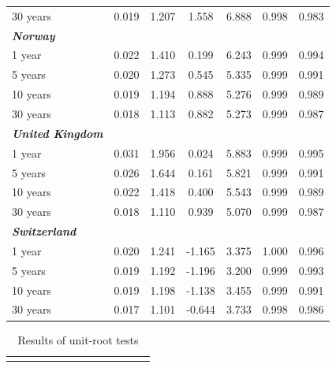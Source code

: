 \documentclass[12pt,bibliography=totoc]{article}
\begin{document}
\begin{appendices}
\begin{table}[H]
\begin{tabular}{l c c c c c c}
30 years	&	0.019	&	1.207	&	1.558	&	6.888	&	0.998	&	0.983	\\
\textbf{\textit{Norway}}	&		&		&		&		&		&		\\
1 year	&	0.022	&	1.410	&	0.199	&	6.243	&	0.999	&	0.994	\\
5 years	&	0.020	&	1.273	&	0.545	&	5.335	&	0.999	&	0.991	\\
10 years	&	0.019	&	1.194	&	0.888	&	5.276	&	0.999	&	0.989	\\
												
30 years	&	0.018	&	1.113	&	0.882	&	5.273	&	0.999	&	0.987	\\
\textbf{\textit{United Kingdom}}	&		&		&		&		&		&		\\
1 year	&	0.031	&	1.956	&	0.024	&	5.883	&	0.999	&	0.995	\\
5 years	&	0.026	&	1.644	&	0.161	&	5.821	&	0.999	&	0.991	\\
10 years	&	0.022	&	1.418	&	0.400	&	5.543	&	0.999	&	0.989	\\
												
30 years	&	0.018	&	1.110	&	0.939	&	5.070	&	0.999	&	0.987	\\
\textbf{\textit{Switzerland}}	&		&		&		&		&		&		\\
1 year	&	0.020	&	1.241	&	-1.165	&	3.375	&	1.000	&	0.996	\\
5 years	&	0.019	&	1.192	&	-1.196	&	3.200	&	0.999	&	0.993	\\
10 years	&	0.019	&	1.198	&	-1.138	&	3.455	&	0.999	&	0.991	\\
30 years	&	0.017	&	1.101	&	-0.644	&	3.733	&	0.998	&	0.986	\\

\hline%
\end{tabular}
\label{table:nonlin}%
\end{table}

\begin{table}
\caption{Results of unit-root tests}
\fontsize{10}{10}\selectfont
\centering%
\captionsetup{justification=centering}

\begin{subtable}[t]{1\textwidth}
\centering%
\begin{tabular}{l cc cc cc cc cc cc}
\hline\hline \\ [-1.5ex]                         
 


\end{tabular}
\end{subtable}
\end{table}
\end{appendices}
\end{document}
